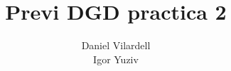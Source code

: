 \documentclass[12pt, a4papre]{article}
\author{Daniel Vilardell\\
	   Igor Yuziv}
\title{Previ DGD practica 2}
\date{}
\begin{document}
	\maketitle
	\newpage
	
	\section{}
	
	\section{}
	
	\section{}
	
	\section{}
	
	\section{}
	
	

	\section{}
	
	\section{}
	
	
	
\end{document}
